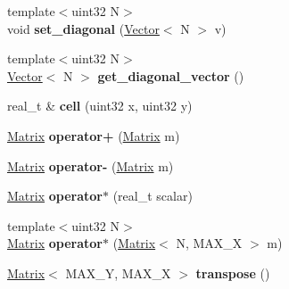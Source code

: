 \begin{DoxyCompactItemize}
\item 
\hypertarget{classetk_1_1_matrix_adba6f054bebc5f457e3b8ca10350c950}{{\footnotesize template$<$uint32 N$>$ }\\void {\bfseries set\-\_\-diagonal} (\hyperlink{classetk_1_1_vector}{Vector}$<$ N $>$ v)}\label{classetk_1_1_matrix_adba6f054bebc5f457e3b8ca10350c950}

\item 
\hypertarget{classetk_1_1_matrix_a68fbc90828c19ae853c37da0413ee954}{{\footnotesize template$<$uint32 N$>$ }\\\hyperlink{classetk_1_1_vector}{Vector}$<$ N $>$ {\bfseries get\-\_\-diagonal\-\_\-vector} ()}\label{classetk_1_1_matrix_a68fbc90828c19ae853c37da0413ee954}

\item 
\hypertarget{classetk_1_1_matrix_ad9d4f7911c16b3242d9fcf0e5740a889}{real\-\_\-t \& {\bfseries cell} (uint32 x, uint32 y)}\label{classetk_1_1_matrix_ad9d4f7911c16b3242d9fcf0e5740a889}

\item 
\hypertarget{classetk_1_1_matrix_a465be428c62e36a4ab0d1112006e79bd}{\hyperlink{classetk_1_1_matrix}{Matrix} {\bfseries operator+} (\hyperlink{classetk_1_1_matrix}{Matrix} m)}\label{classetk_1_1_matrix_a465be428c62e36a4ab0d1112006e79bd}

\item 
\hypertarget{classetk_1_1_matrix_a820352c0703315ed72951067b4d65d72}{\hyperlink{classetk_1_1_matrix}{Matrix} {\bfseries operator-\/} (\hyperlink{classetk_1_1_matrix}{Matrix} m)}\label{classetk_1_1_matrix_a820352c0703315ed72951067b4d65d72}

\item 
\hypertarget{classetk_1_1_matrix_aa3706852437cb3a8781fb5f426064122}{\hyperlink{classetk_1_1_matrix}{Matrix} {\bfseries operator$\ast$} (real\-\_\-t scalar)}\label{classetk_1_1_matrix_aa3706852437cb3a8781fb5f426064122}

\item 
\hypertarget{classetk_1_1_matrix_a6744d34d9ce5246c360648aec83c1abe}{{\footnotesize template$<$uint32 N$>$ }\\\hyperlink{classetk_1_1_matrix}{Matrix} {\bfseries operator$\ast$} (\hyperlink{classetk_1_1_matrix}{Matrix}$<$ N, M\-A\-X\-\_\-\-X $>$ m)}\label{classetk_1_1_matrix_a6744d34d9ce5246c360648aec83c1abe}

\item 
\hypertarget{classetk_1_1_matrix_a6c4e00132a3b9299bdcf2b05db4750f8}{\hyperlink{classetk_1_1_matrix}{Matrix}$<$ M\-A\-X\-\_\-\-Y, M\-A\-X\-\_\-\-X $>$ {\bfseries transpose} ()}\label{classetk_1_1_matrix_a6c4e00132a3b9299bdcf2b05db4750f8}


\end{DoxyCompactItemize}

